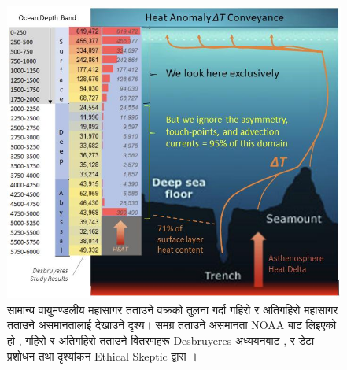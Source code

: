 \documentclass[10pt,twocolumn,letterpaper]{article}
\begin{document}
\begin{figure}[t]
\begin{center}
\includegraphics[width=1\textwidth]{deepsea.jpg}
\end{center}
   \caption{सामान्य वायुमण्डलीय महासागर तताउने वक्रको तुलना गर्दा गहिरो र अतिगहिरो महासागर तताउने असमानतालाई देखाउने दृश्य। समग्र तताउने असमानता NOAA बाट लिइएको हो \cite{147}, गहिरो र अतिगहिरो तताउने वितरणहरू Desbruyeres अध्ययनबाट \cite{132}, र डेटा प्रशोधन तथा दृश्यांकन Ethical Skeptic द्वारा \cite{129}।}
\label{fig:21}
\end{figure}
\end{document}
